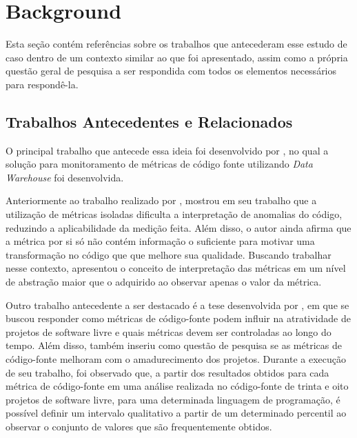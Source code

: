 \section{Background}\label{sec:Background}

Esta seção contém referências sobre os trabalhos que antecederam esse estudo de caso dentro de um contexto similar ao que foi apresentado, assim como a própria questão geral de pesquisa a ser respondida com todos os elementos necessários para respondê-la.

\subsection{Trabalhos Antecedentes e Relacionados}

O principal trabalho que antecede essa ideia foi desenvolvido por , no qual a solução para monitoramento de métricas de código fonte utilizando \textit{Data Warehouse} foi desenvolvida.

Anteriormente ao trabalho realizado por ,  mostrou em seu trabalho que a utilização de métricas isoladas dificulta a interpretação de anomalias do código, reduzindo a aplicabilidade da medição feita. Além disso, o autor ainda afirma que a métrica por si só não contém informação o suficiente para motivar uma transformação no código que que melhore sua qualidade. Buscando trabalhar nesse contexto,  apresentou o conceito de interpretação das métricas em um nível de abstração maior que o adquirido ao observar apenas o valor da métrica.

Outro trabalho antecedente a ser destacado é a tese desenvolvida por , em que se buscou responder como métricas de código-fonte podem influir na atratividade de projetos de software livre e quais métricas devem ser controladas ao longo do tempo. Além disso,  também inseriu como questão de pesquisa se as métricas de código-fonte melhoram com o amadurecimento dos projetos. Durante a execução de seu trabalho, foi observado que, a partir dos resultados obtidos para cada métrica de
código-fonte em uma análise realizada no código-fonte de trinta e oito projetos de software livre, para uma determinada linguagem de programação, é possível definir um intervalo qualitativo a partir de um determinado percentil ao observar o conjunto de valores que são frequentemente obtidos.

